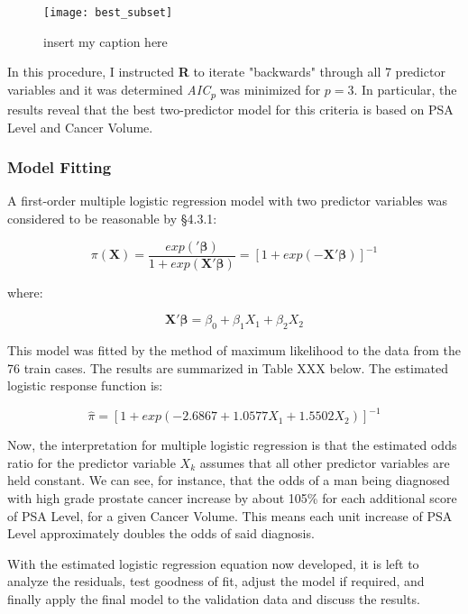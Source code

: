\begin{figure}[H]
	\centering
	\texttt{[image: best\_subset]}
	\caption{insert my caption here}
\end{figure}

In this procedure, I instructed \textbf{R} to iterate "backwards" through all 7 predictor variables and it was determined \textit{AIC\textsubscript{p}} was minimized for \(p=3\). In particular, the results reveal that the best two-predictor model for this criteria is based on PSA Level and Cancer Volume.


\subsubsection{Model Fitting}
A first-order multiple logistic regression model with two predictor variables was considered to be reasonable by \S4.3.1: 

\begin{equation}
\pi(\textbf{X}) = \frac{exp('\boldsymbol{\beta})}{1+exp(\textbf{X}'\boldsymbol{\beta})} = [1+exp(-\textbf{X}'\boldsymbol{\beta})]^{-1}
\end{equation}

where:

\begin{equation}
\textbf{X}'\boldsymbol{\beta} = \beta_0+\beta_1X_1+\beta_2X_2
\end{equation}

This model was fitted by the method of maximum likelihood to the data from the 76 train cases. The results are summarized in Table XXX below. The estimated logistic response function is:

\begin{equation}
\hat{\pi}=[ 1+ exp(-2.6867 + 1.0577X_1 + 1.5502X_2)]^{-1}
\end{equation}

Now, the interpretation for multiple logistic regression is that the estimated odds ratio for the predictor variable \(X_k\) assumes that all other predictor variables are held constant. We can see, for instance, that the odds of a man being diagnosed with high grade prostate cancer increase by about 105\% for each additional score of PSA Level, for a given Cancer Volume. This means each unit increase of PSA Level approximately doubles the odds of said diagnosis. \par
With the estimated logistic regression equation now developed, it is left to analyze the residuals, test goodness of fit, adjust the model if required, and finally apply the final model to the validation data and discuss the results.

